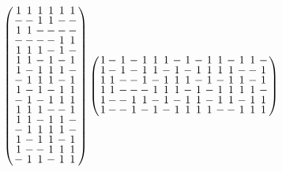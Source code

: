 \documentclass{beamer}
\begin{document}
\begin{frame}

  \[
    \arraycolsep=1.0pt\def\arraystretch{0.75}
    \left(
      \begin{array}{cccccc}
        1&1&1&1&1&1\\
        -&-&1&1&-&-\\
        1&1&-&-&-&-\\
        -&-&-&-&1&1\\
        1&1&1&-&1&-\\
        1&1&-&1&-&1\\
        1&-&1&1&1&-\\
        -&1&1&1&-&1\\
        1&-&1&-&1&1\\
        -&1&-&1&1&1\\
        1&1&1&-&-&1\\
        1&1&-&1&1&-\\
        -&1&1&1&1&-\\
        1&-&1&1&-&1\\
        1&-&-&1&1&1\\
        -&1&1&-&1&1\\
      \end{array}
    \right)
    \arraycolsep=1.0pt\def\arraystretch{0.75}
    \left(
      \begin{array}{cccccccccccccccc}
        1&-&1&-&1&1&1&-&1&-&1&1&-&1&1&-\\
        1&-&1&-&1&1&-&1&-&1&1&1&1&-&-&1\\
        1&1&-&-&1&-&1&1&1&-&1&-&1&1&-&1\\
        1&1&-&-&-&1&1&1&-&1&-&1&1&1&1&-\\
        1&-&-&1&1&-&1&-&1&1&-&1&1&-&1&1\\
        1&-&-&1&-&1&-&1&1&1&1&-&-&1&1&1\\
      \end{array}
    \right)
  \]
  
\end{frame}
\end{document}

